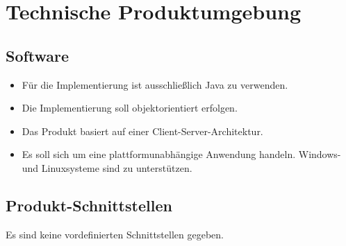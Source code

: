 \chapter{Technische Produktumgebung}

	\section{Software}

		\begin{itemize}
			\item Für die Implementierung ist ausschließlich Java zu verwenden.
			\item Die Implementierung soll objektorientiert erfolgen.
			\item Das Produkt basiert auf einer Client-Server-Architektur.
			\item Es soll sich um eine plattformunabhängige Anwendung handeln. Windows- und Linuxsysteme sind zu unterstützen.
		\end{itemize}

	\section{Produkt-Schnittstellen}

		Es sind keine vordefinierten Schnittstellen gegeben.
